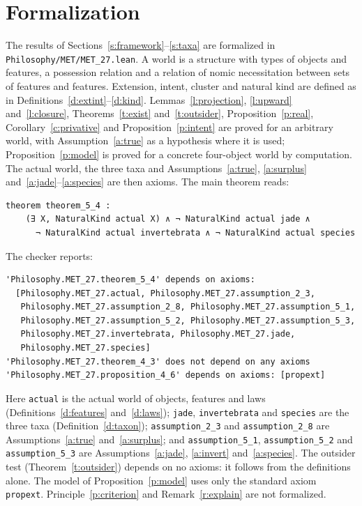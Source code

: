 \documentclass{situationist-preprint}
\begin{document}
\section{Formalization}\label{s:formal}

The results of Sections~\ref{s:framework}--\ref{s:taxa} are formalized in \nolinkurl{Philosophy/MET/MET_27.lean}. A world is a structure with types of objects and features, a possession relation and a relation of nomic necessitation between sets of features and features. Extension, intent, cluster and natural kind are defined as in Definitions~\ref{d:extint}--\ref{d:kind}. Lemmas~\ref{l:projection}, \ref{l:upward} and~\ref{l:closure}, Theorems~\ref{t:exist} and~\ref{t:outsider}, Proposition~\ref{p:real}, Corollary~\ref{c:privative} and Proposition~\ref{p:intent} are proved for an arbitrary world, with Assumption~\ref{a:true} as a hypothesis where it is used; Proposition~\ref{p:model} is proved for a concrete four-object world by computation. The actual world, the three taxa and Assumptions~\ref{a:true}, \ref{a:surplus} and~\ref{a:jade}--\ref{a:species} are then axioms. The main theorem reads:

\begin{lstlisting}
theorem theorem_5_4 :
    (∃ X, NaturalKind actual X) ∧ ¬ NaturalKind actual jade ∧
      ¬ NaturalKind actual invertebrata ∧ ¬ NaturalKind actual species
\end{lstlisting}

\noindent The checker reports:

\begin{lstlisting}
'Philosophy.MET_27.theorem_5_4' depends on axioms:
  [Philosophy.MET_27.actual, Philosophy.MET_27.assumption_2_3,
   Philosophy.MET_27.assumption_2_8, Philosophy.MET_27.assumption_5_1,
   Philosophy.MET_27.assumption_5_2, Philosophy.MET_27.assumption_5_3,
   Philosophy.MET_27.invertebrata, Philosophy.MET_27.jade,
   Philosophy.MET_27.species]
'Philosophy.MET_27.theorem_4_3' does not depend on any axioms
'Philosophy.MET_27.proposition_4_6' depends on axioms: [propext]
\end{lstlisting}

\noindent Here \texttt{actual} is the actual world of objects, features and laws (Definitions~\ref{d:features} and~\ref{d:laws}); \texttt{jade}, \texttt{invertebrata} and \texttt{species} are the three taxa (Definition~\ref{d:taxon}); \texttt{assumption\_2\_3} and \texttt{assumption\_2\_8} are Assumptions~\ref{a:true} and~\ref{a:surplus}; and \texttt{assumption\_5\_1}, \texttt{assumption\_5\_2} and \texttt{assumption\_5\_3} are Assumptions~\ref{a:jade}, \ref{a:invert} and~\ref{a:species}. The outsider test (Theorem~\ref{t:outsider}) depends on no axioms: it follows from the definitions alone. The model of Proposition~\ref{p:model} uses only the standard axiom \texttt{propext}. Principle~\ref{p:criterion} and Remark~\ref{r:explain} are not formalized.
\end{document}
